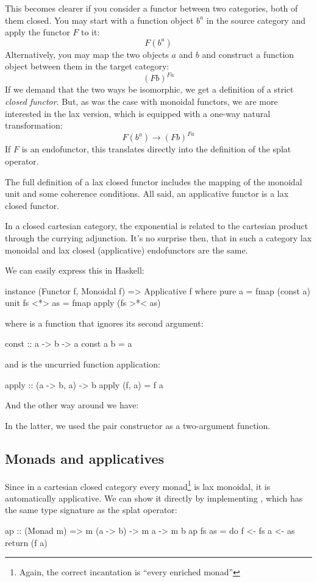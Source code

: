 \documentclass[DaoFP]{subfiles}
\begin{document}
This becomes clearer if you consider a functor between two categories, both of them closed. You may start with a function object $b^a$ in the source category and apply the functor $F$ to it:
\[ F (b^a) \]
Alternatively, you may map the two objects $a$ and $b$ and construct a function object between them in the target category:
\[ (F b)^{F a} \]
If we demand that the two ways be isomorphic, we get a definition of a strict \emph{closed functor}. But, as was the case with monoidal functors, we are more interested in the lax version, which is equipped with a one-way natural transformation:
\[ F (b^a) \to (F b)^{F a} \]
If $F$ is an endofunctor, this translates directly into the definition of the splat operator. 

The full definition of a lax closed functor includes the mapping of the monoidal unit and some coherence conditions. All said, an applicative functor is a lax closed functor.

In a closed cartesian category, the exponential is related to the cartesian product through the currying adjunction. It's no surprise then, that in such a category lax monoidal and lax closed (applicative) endofunctors are the same. 

We can easily express this in Haskell:
\begin{haskell}
instance (Functor f, Monoidal f) => Applicative f where
  pure a = fmap (const a) unit
  fs <*> as = fmap apply (fs >*< as)
\end{haskell}
where  is a function that ignores its second argument:
\begin{haskell}
const :: a -> b -> a
const a b = a
\end{haskell}
and  is the uncurried function application:
\begin{haskell}
apply :: (a -> b, a) -> b
apply (f, a) = f a
\end{haskell}
And the other way around we have:
In the latter, we used the pair constructor \hask{(,)} as a two-argument function.

\subsection{Monads and applicatives}

Since in a cartesian closed category every monad\footnote{Again, the correct incantation is ``every enriched monad''} is lax monoidal, it is automatically applicative. We can show it directly by implementing , which has the same type signature as the splat operator:
\begin{haskell}
ap :: (Monad m) => m (a -> b) -> m a -> m b
ap fs as = do 
    f <- fs
    a <- as
    return (f a) 
\end{haskell}
\end{document}
